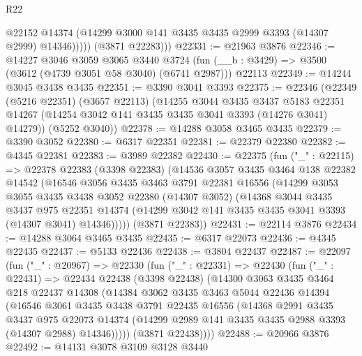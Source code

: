 \begin{lexlean}{R22}
\begin{coremodule}
                @22152
                @14374
                (@14299 @3000 @141 @3435 @3435 @2999 @3393 (@14307 @2999) @14346)))))
        (@3871 @22283)))
@22331 := @21963 @3876
@22346 := @14227
    @3046
    @3059
    @3065
    @3440
    @3724
    (fun (__b : @3429) => @3500 (@3612 (@4739 @3051 @58 @3040) (@6741 @2987)))
    @22113
@22349 := @14244 @3045 @3438 @3435
@22351 := @3390 @3041 @3393
@22375 := @22346
    (@22349
      (@5216 @22351)
      (@3657 @22113)
      (@14255
        @3044
        @3435
        @3437
        @5183
        @22351
        @14267
        (@14254 @3042 @141 @3435 @3435 @3041 @3393 (@14276 @3041) @14279))
      (@5252 @3040))
@22378 := @14288 @3058 @3465 @3435
@22379 := @3390 @3052
@22380 := @6317 @22351
@22381 := @22379 @22380
@22382 := @4345 @22381
@22383 := @3989 @22382
@22430 := @22375
    (fun ("_" : @22115) =>
    @22378
      @22383
      (@3398 @22383)
      (@14536
        @3057
        @3435
        @3464
        @138
        @22382
        @14542
        (@16546
          @3056
          @3435
          @3463
          @3791
          @22381
          @16556
          (@14299
            @3053
            @3055
            @3435
            @3438
            @3052
            @22380
            (@14307 @3052)
            (@14368
              @3044
              @3435
              @3437
              @975
              @22351
              @14374
              (@14299 @3042 @141 @3435 @3435 @3041 @3393 (@14307 @3041) @14346)))))
      (@3871 @22383))
@22431 := @22114 @3876
@22434 := @14288 @3064 @3465 @3435
@22435 := @6317 @22073
@22436 := @4345 @22435
@22437 := @5133 @22436
@22438 := @3804 @22437
@22487 := @22097
    (fun ("_" : @20967) =>
    @22330
      (fun ("_" : @22331) =>
      @22430
        (fun ("_" : @22431) =>
        @22434
          @22438
          (@3398 @22438)
          (@14300
            @3063
            @3435
            @3464
            @218
            @22437
            @14308
            (@14384
              @3062
              @3435
              @3463
              @5044
              @22436
              @14394
              (@16546
                @3061
                @3435
                @3438
                @3791
                @22435
                @16556
                (@14368
                  @2991
                  @3435
                  @3437
                  @975
                  @22073
                  @14374
                  (@14299 @2989 @141 @3435 @3435 @2988 @3393 (@14307 @2988) @14346)))))
          (@3871 @22438))))
@22488 := @20966 @3876
@22492 := @14131 @3078 @3109 @3128 @3440

\end{coremodule}
\end{lexlean}
